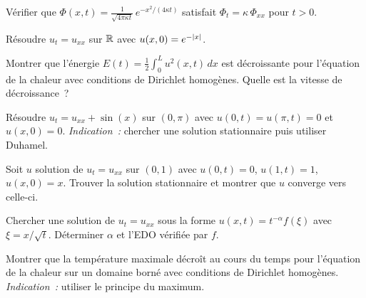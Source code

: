 \begin{exercice}
V\'erifier que $\Phi(x,t) = \frac{1}{\sqrt{4\pi\kappa t}}\, e^{-x^2/(4\kappa t)}$
satisfait $\Phi_t = \kappa\, \Phi_{xx}$ pour $t > 0$.
\end{exercice}

\begin{exercice}
R\'esoudre $u_t = u_{xx}$ sur $\mathbb{R}$ avec $u(x,0) = e^{-\left| x \right|}$.
\end{exercice}

\begin{exercice}
Montrer que l'\'energie $E(t) = \frac{1}{2}\int_0^L u^2(x,t)\, dx$
est d\'ecroissante pour l'\'equation de la chaleur avec conditions de
Dirichlet homog\`enes. Quelle est la vitesse de d\'ecroissance~?
\end{exercice}

\begin{exercice}
R\'esoudre $u_t = u_{xx} + \sin(x)$ sur $(0,\pi)$ avec $u(0,t) = u(\pi,t) = 0$
et $u(x,0) = 0$. \emph{Indication~:} chercher une solution stationnaire
puis utiliser Duhamel.
\end{exercice}

\begin{exercice}
Soit $u$ solution de $u_t = u_{xx}$ sur $(0,1)$ avec $u(0,t) = 0$,
$u(1,t) = 1$, $u(x,0) = x$. Trouver la solution stationnaire et montrer
que $u$ converge vers celle-ci.
\end{exercice}

\begin{exercice}[Autosimilarit\'e]
Chercher une solution de $u_t = u_{xx}$ sous la forme
$u(x,t) = t^{-\alpha} f(\xi)$ avec $\xi = x/\sqrt{t}$.
D\'eterminer $\alpha$ et l'EDO v\'erifi\'ee par $f$.
\end{exercice}

\begin{exercice}
Montrer que la temp\'erature maximale d\'ecro\^it au cours du temps pour
l'\'equation de la chaleur sur un domaine born\'e avec conditions de
Dirichlet homog\`enes. \emph{Indication~:} utiliser le principe du maximum.
\end{exercice}
